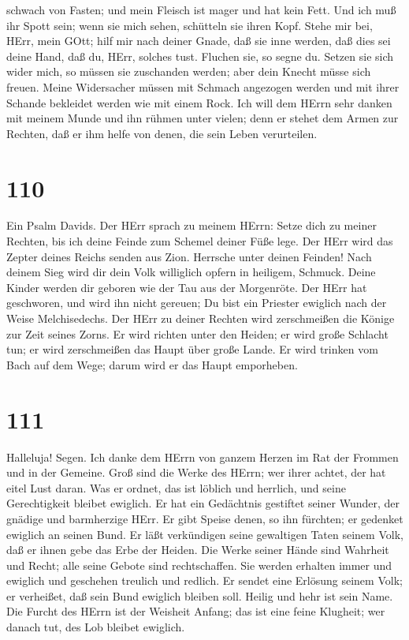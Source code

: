 schwach von Fasten; und mein Fleisch ist mager und hat kein Fett.
 Und ich muß ihr Spott sein; wenn sie mich sehen, schütteln
sie ihren Kopf.  Stehe mir bei, HErr, mein GOtt; hilf mir
nach deiner Gnade,  daß sie inne werden, daß dies sei deine
Hand, daß du, HErr, solches tust.  Fluchen sie, so segne
du. Setzen sie sich wider mich, so müssen sie zuschanden werden; aber
dein Knecht müsse sich freuen.  Meine Widersacher müssen
mit Schmach angezogen werden und mit ihrer Schande bekleidet werden wie
mit einem Rock.  Ich will dem HErrn sehr danken mit meinem
Munde und ihn rühmen unter vielen;  denn er stehet dem
Armen zur Rechten, daß er ihm helfe von denen, die sein Leben
verurteilen.

\hypertarget{section-109}{%
\section{110}\label{section-109}}

 Ein Psalm Davids. Der HErr sprach zu meinem HErrn: Setze
dich zu meiner Rechten, bis ich deine Feinde zum Schemel deiner Füße
lege.  Der HErr wird das Zepter deines Reichs senden aus
Zion. Herrsche unter deinen Feinden!  Nach deinem Sieg wird
dir dein Volk williglich opfern in heiligem, Schmuck. Deine Kinder
werden dir geboren wie der Tau aus der Morgenröte.  Der HErr
hat geschworen, und wird ihn nicht gereuen; Du bist ein Priester
ewiglich nach der Weise Melchisedechs.  Der HErr zu deiner
Rechten wird zerschmeißen die Könige zur Zeit seines Zorns. 
Er wird richten unter den Heiden; er wird große Schlacht tun; er wird
zerschmeißen das Haupt über große Lande.  Er wird trinken
vom Bach auf dem Wege; darum wird er das Haupt emporheben.

\hypertarget{section-110}{%
\section{111}\label{section-110}}

 Halleluja! Segen. Ich danke dem HErrn von ganzem Herzen im
Rat der Frommen und in der Gemeine.  Groß sind die Werke des
HErrn; wer ihrer achtet, der hat eitel Lust daran.  Was er
ordnet, das ist löblich und herrlich, und seine Gerechtigkeit bleibet
ewiglich.  Er hat ein Gedächtnis gestiftet seiner Wunder,
der gnädige und barmherzige HErr.  Er gibt Speise denen, so
ihn fürchten; er gedenket ewiglich an seinen Bund.  Er läßt
verkündigen seine gewaltigen Taten seinem Volk, daß er ihnen gebe das
Erbe der Heiden.  Die Werke seiner Hände sind Wahrheit und
Recht; alle seine Gebote sind rechtschaffen.  Sie werden
erhalten immer und ewiglich und geschehen treulich und redlich.
 Er sendet eine Erlösung seinem Volk; er verheißet, daß sein
Bund ewiglich bleiben soll. Heilig und hehr ist sein Name. 
Die Furcht des HErrn ist der Weisheit Anfang; das ist eine feine
Klugheit; wer danach tut, des Lob bleibet ewiglich.

